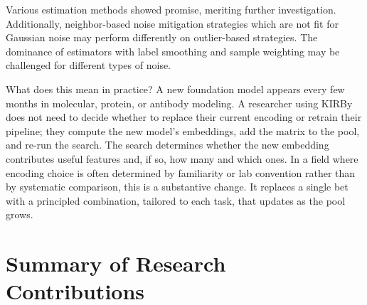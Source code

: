 Various estimation methods showed promise, meriting further investigation. Additionally, neighbor-based noise mitigation strategies which are not fit for Gaussian noise may perform differently on outlier-based strategies. The dominance of estimators with label smoothing and sample weighting may be challenged for different types of noise.

What does this mean in practice? A new foundation model appears every few months in molecular, protein, or antibody modeling. A researcher using KIRBy does not need to decide whether to replace their current encoding or retrain their pipeline; they compute the new model's embeddings, add the matrix to the pool, and re-run the search. The search determines whether the new embedding contributes useful features and, if so, how many and which ones. In a field where encoding choice is often determined by familiarity or lab convention rather than by systematic comparison, this is a substantive change. It replaces a single bet with a principled combination, tailored to each task, that updates as the pool grows.


\pagebreak
\chapter*{Summary of Research Contributions}

